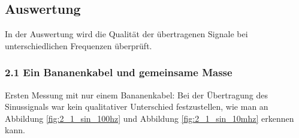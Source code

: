 \documentclass[12pt,a4paper]{article}
\begin{document}
\subsection{Auswertung}

In der Auswertung wird die Qualität der übertragenen Signale bei unterschiedlichen Frequenzen überprüft.

\subsubsection{2.1 Ein Bananenkabel und gemeinsame Masse}

Ersten Messung mit nur einem Bananenkabel:
Bei der Übertragung des Sinussignals war kein qualitativer Unterschied festzustellen, wie man an Abbildung \ref{fig:2_1_sin_100hz} und Abbildung \ref{fig:2_1_sin_10mhz} erkennen kann.
\end{document}
